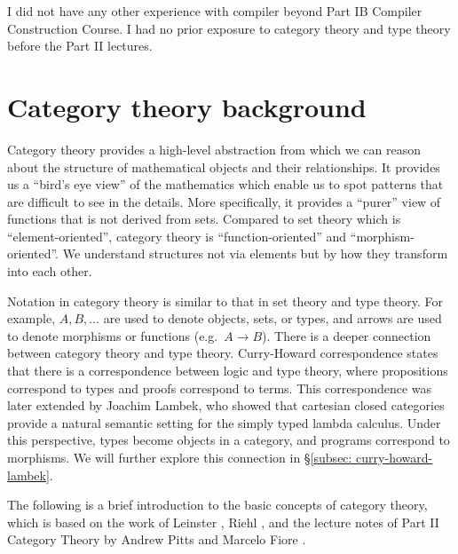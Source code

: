 \documentclass[12pt,twoside,a4paper]{report}
\theoremstyle{definition}
\theoremstyle{definition}
\newcommand{\secref}[1]{\S\ref{#1}}
\begin{document}
    I did not have any other experience with compiler beyond Part IB Compiler Construction Course. I had no prior exposure to category theory and type theory before the Part II lectures.


    \section{Category theory background} \label{sec: cat}
        Category theory provides a high-level abstraction from which we can reason about the structure of mathematical objects and their relationships. It provides us a ``bird's eye view'' of the mathematics which enable us to spot patterns that are difficult to see in the details. \cite{basic_cat} More specifically, it provides a ``purer'' view of functions that is not derived from sets. \cite{scott-lambda} Compared to set theory which is ``element-oriented'', category theory is ``function-oriented'' and ``morphism-oriented''. We understand structures not via elements but by how they transform into each other. 

        Notation in category theory is similar to that in set theory and type theory. For example, $A, B, \dots$ are used to denote objects, sets, or types, and arrows are used to denote morphisms or functions (e.g.\ $A \to B$). There is a deeper connection between category theory and type theory. Curry-Howard correspondence \cite{curry-howard} states that there is a correspondence between logic and type theory, where propositions correspond to types and proofs correspond to terms. This correspondence was later extended by Joachim Lambek, who showed that cartesian closed categories provide a natural semantic setting for the simply typed lambda calculus. \cite{lambek} Under this perspective, types become objects in a category, and programs correspond to morphisms. We will further explore this connection in \secref{subsec: curry-howard-lambek}.


        The following is a brief introduction to the basic concepts of category theory, which is based on the work of Leinster \cite{basic_cat}, 
        Riehl \cite{cat_context}, and the lecture notes of Part II Category Theory by Andrew Pitts and Marcelo Fiore \cite{cat_lecture_notes}.
\end{document}
